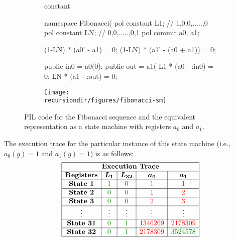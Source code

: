 \begin{figure}[H]
\centering
\begin{subfigure}[T]{0.5\textwidth}
\begin{pil}
constant %

namespace Fibonacci(%
    pol constant L1;    // 1,0,0,.....,0
    pol constant LN;    // 0,0,.....,0,1
    pol commit a0, a1;

    (1-LN) * (a0' - a1) = 0;
    (1-LN) * (a1' - (a0 + a1)) = 0;

    public in0 = a0(0);
    public out = a1(%
    L1 * (a0 - :in0) = 0;
    LN * (a1 - :out) = 0;
\end{pil}
\end{subfigure}
\begin{subfigure}[T]{0.4\textwidth}
    \centering
    \texttt{[image: \\recursiondir/figures/fibonacci-sm]}
\end{subfigure}
\caption{PIL code for the Fibonacci sequence and the equivalent representation as a state machine with registers $a_0$ and $a_1$.}
\label{fig:Fibo-sm}
\end{figure}

The execution trace for the particular instance of this state machine (i.e., $a_0(g) = 1$ and $a_1(g) = 1$) is as follows:
\[
\begin{array}{|c|c|c|c|c|}
\hline
\multicolumn{5}{|c|}{\textbf{Execution Trace}} \\\hline
\textbf{Registers} & \boldsymbol{L_1} & \boldsymbol{L_{32}} & \boldsymbol{a_0} & \boldsymbol{a_1} \\\hline
\textbf{State 1} & {\color{green!50!black} 1} & {\color{green!50!black} 0} & {\color{green!50!black} 1} & {\color{red} 1} \\\hline
\textbf{State 2} & {\color{green!50!black} 0} & {\color{green!50!black} 0} & {\color{red} 1} & {\color{red} 2} \\\hline
\textbf{State 3} & {\color{green!50!black} 0} & {\color{green!50!black} 0} & {\color{red} 2} & {\color{red} 3} \\\hline
\vdots & \vdots & \vdots & \vdots & \vdots \\\hline
\textbf{State 31} & {\color{green!50!black} 0} & {\color{green!50!black} 1} & {\color{red} 1346269} & {\color{red} 2178309} \\\hline
\textbf{State 32} & {\color{green!50!black} 0} & {\color{green!50!black} 1} & {\color{red} 2178309} & {\color{green!50!black} 3524578} \\
\hline
\end{array}
\]

